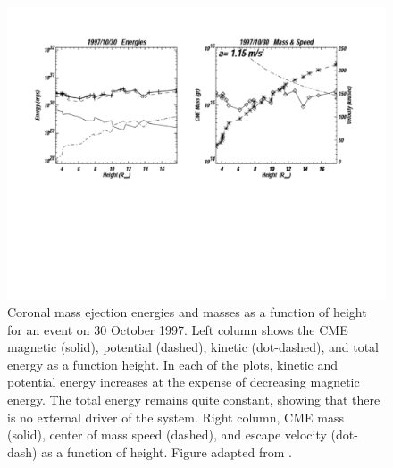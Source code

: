 \begin{figure}[t!]
\begin{center}
\includegraphics[scale=0.6, trim=1.5cm 8cm 2cm 2.0cm]{images/cme_energies2.pdf}
\caption[CME energies and masses as a function of height]{Coronal mass ejection energies and masses as a function of height for an event on 30 October 1997.
Left column shows the CME magnetic (solid), potential (dashed), kinetic (dot-dashed), and total energy as a function
height. In each of the plots, kinetic and potential energy increases at the expense of decreasing magnetic energy. The total energy 
remains quite constant, showing that there is no external driver of the system. Right column, CME mass (solid), center of mass speed (dashed), and escape velocity (dot-dash) as a function of height. Figure adapted from \citet{vou00}.}
\label{fig:cme_energies}
\end{center} 
\end{figure}
